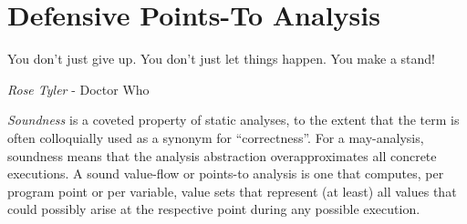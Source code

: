 \chapter{Defensive Points-To Analysis}\label{chapter:defensive}

\epigraph{You don’t just give up. You don’t just let things happen. You make a stand!}{\textit{Rose Tyler} - Doctor Who}






\emph{Soundness} is a coveted property of static analyses, to the
extent that the term is often colloquially used as a synonym for
``correctness''. For a may-analysis, soundness means that the analysis
abstraction overapproximates all concrete executions. A sound
value-flow or points-to analysis is one that computes, per program
point or per variable, value sets that represent (at least) all values
that could possibly arise at the respective point during any possible
execution.

